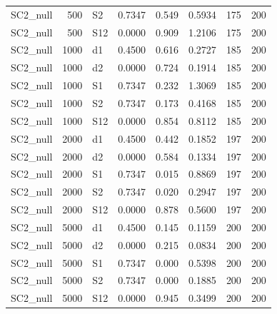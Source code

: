 \begin{table}[ht]
\begin{tabular}{lrlrrrrr}
  SC2\_null & 500 & S2 & 0.7347 & 0.549 & 0.5934 & 175 & 200 \\ 
  SC2\_null & 500 & S12 & 0.0000 & 0.909 & 1.2106 & 175 & 200 \\ 
  SC2\_null & 1000 & d1 & 0.4500 & 0.616 & 0.2727 & 185 & 200 \\ 
  SC2\_null & 1000 & d2 & 0.0000 & 0.724 & 0.1914 & 185 & 200 \\ 
  SC2\_null & 1000 & S1 & 0.7347 & 0.232 & 1.3069 & 185 & 200 \\ 
  SC2\_null & 1000 & S2 & 0.7347 & 0.173 & 0.4168 & 185 & 200 \\ 
  SC2\_null & 1000 & S12 & 0.0000 & 0.854 & 0.8112 & 185 & 200 \\ 
  SC2\_null & 2000 & d1 & 0.4500 & 0.442 & 0.1852 & 197 & 200 \\ 
  SC2\_null & 2000 & d2 & 0.0000 & 0.584 & 0.1334 & 197 & 200 \\ 
  SC2\_null & 2000 & S1 & 0.7347 & 0.015 & 0.8869 & 197 & 200 \\ 
  SC2\_null & 2000 & S2 & 0.7347 & 0.020 & 0.2947 & 197 & 200 \\ 
  SC2\_null & 2000 & S12 & 0.0000 & 0.878 & 0.5600 & 197 & 200 \\ 
  SC2\_null & 5000 & d1 & 0.4500 & 0.145 & 0.1159 & 200 & 200 \\ 
  SC2\_null & 5000 & d2 & 0.0000 & 0.215 & 0.0834 & 200 & 200 \\ 
  SC2\_null & 5000 & S1 & 0.7347 & 0.000 & 0.5398 & 200 & 200 \\ 
  SC2\_null & 5000 & S2 & 0.7347 & 0.000 & 0.1885 & 200 & 200 \\ 
  SC2\_null & 5000 & S12 & 0.0000 & 0.945 & 0.3499 & 200 & 200 \\ 
   \hline
\end{tabular}
\end{table}
